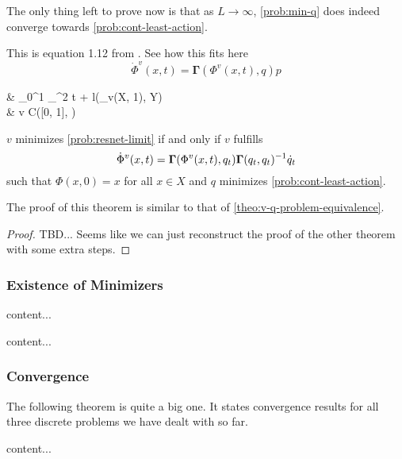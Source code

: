 The only thing left to prove now is that as $L \rightarrow \infty$, \cref{prob:min-q} does indeed converge towards \cref{prob:cont-least-action}.



This is equation 1.12 from \cite{owhadi20}.
See how this fits here
\begin{equation}
	\label{eq:phi-v-differential-equation}
	\dot{\Phi}^v(x, t) = \mathbf{\Gamma}(\Phi^v(x, t), q) p
\end{equation}

\begin{problem}
	\label{prob:resnet-limit}
	\begin{cases}
		&  \int_{0}^{1} _^2 t
		+ l(\phi_v(X, 1), Y)\\
		& v \in C([0, 1], )\\
	\end{cases}
\end{problem}

\begin{theorem}
	\label{theo:v-q-continuous-problem-equivalence}
	$v$ minimizes \cref{prob:resnet-limit} if and only if $v$ fulfills
	\begin{equation}
			\dot{\Phi}^v(x, t) = \mathbf{\Gamma}(\Phi^v(x, t), q_t) \mathbf{\Gamma}(q_t, q_t)^{-1} \dot{q}_t
	\end{equation}
	such that $\Phi(x, 0) = x$ for all $x \in X$ and $q$ minimizes \cref{prob:cont-least-action}.
\end{theorem}
The proof of this theorem is similar to that of \cref{theo:v-q-problem-equivalence}.
\begin{proof}
	TBD... Seems like we can just reconstruct the proof of the other theorem with some extra steps.
\end{proof}


\subsubsection{Existence of Minimizers}

\begin{theorem}
	content...
\end{theorem}

\begin{theorem}
	content...
\end{theorem}


\subsubsection{Convergence}

The following theorem is quite a big one.
It states convergence results for all three discrete problems we have dealt with so far.
\begin{theorem}
	\label{theo:problem-convergence}
	content...
\end{theorem}